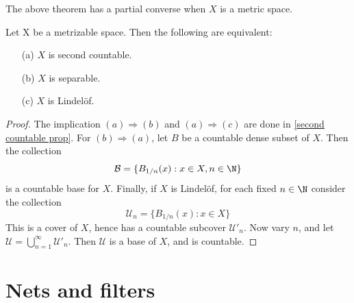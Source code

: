 The above theorem has a partial converse when $X$ is a metric space.
\begin{theorem}\label{metric space second countable iff}
Let X be a metrizable space. Then the following are equivalent:
\begin{itemize}
\item[(a)] $X$ is second countable.
\item[(b)] $X$ is separable.
\item[(c)] $X$ is Lindel\"of.
\end{itemize}
\end{theorem}
\begin{proof}
The implication $(a)\Rightarrow(b)$ and $(a)\Rightarrow(c)$ are done in \cref{second countable prop}. For $(b)\Rightarrow(a)$, let $B$ be a countable dense subset of $X$. Then the collection 
\[\mathcal{B}=\{B_{1/n}(x):x\in X,n\in\N\}\]
is a countable base for $X$. Finally, if $X$ is Lindel\"of, for each fixed $n\in\N$ consider the collection
\[\mathcal{U}_n=\{B_{1/n}(x):x\in X\}\]
This is a cover of $X$, hence has a countable subcover $\mathcal{U}'_n$. Now vary $n$, and let $\mathcal{U}=\bigcup_{n=1}^{\infty}\mathcal{U}'_n$. Then $\mathcal{U}$ is a base of $X$, and is countable.
\end{proof}
\section{Nets and filters}
